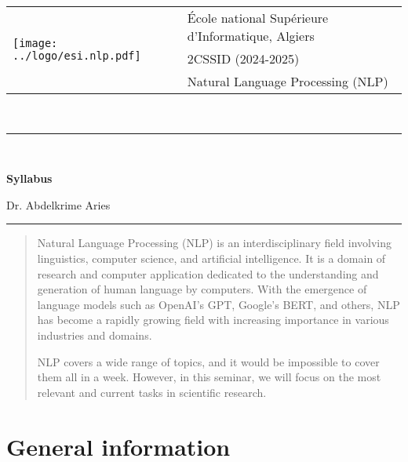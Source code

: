 \documentclass[11pt, a4paper]{article}
\begin{document}
\pagestyle{fancy}

\noindent
\begin{tabular}{ll}
\multirow{3}{*}{\texttt{[image: ../logo/esi.nlp.pdf]}} & \'Ecole national Supérieure d'Informatique, Algiers\\
& 2CSSID (2024-2025)\\
& Natural Language Processing (NLP)
\end{tabular}\\[.25cm]
\noindent\rule{\textwidth}{1pt}\\[-0.25cm]
\begin{center}
{\LARGE \textbf{Syllabus}}
\begin{flushright}
	Dr. Abdelkrime Aries
\end{flushright}
\end{center}\vspace*{-0.25cm}
\noindent\rule{\textwidth}{1pt}

\begin{abstract}
	Natural Language Processing (NLP) is an interdisciplinary field involving linguistics, computer science, and artificial intelligence. 
	It is a domain of research and computer application dedicated to the understanding and generation of human language by computers. 
	With the emergence of language models such as OpenAI's GPT, Google's BERT, and others, NLP has become a rapidly growing field with increasing importance in various industries and domains.
	
	NLP covers a wide range of topics, and it would be impossible to cover them all in a week. 
	However, in this seminar, we will focus on the most relevant and current tasks in scientific research.
\end{abstract}

\section{General information}
\end{document}
